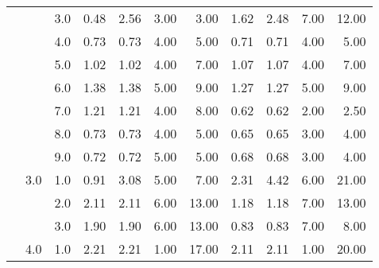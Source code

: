 \begin{tabular}{lllrrrrrrrr}
          &     & 3.0  &       0.48 &      2.56 &  3.00 &   3.00 &       1.62 &      2.48 &  7.00 &  12.00 \\
          &     & 4.0  &       0.73 &      0.73 &  4.00 &   5.00 &       0.71 &      0.71 &  4.00 &   5.00 \\
          &     & 5.0  &       1.02 &      1.02 &  4.00 &   7.00 &       1.07 &      1.07 &  4.00 &   7.00 \\
          &     & 6.0  &       1.38 &      1.38 &  5.00 &   9.00 &       1.27 &      1.27 &  5.00 &   9.00 \\
          &     & 7.0  &       1.21 &      1.21 &  4.00 &   8.00 &       0.62 &      0.62 &  2.00 &   2.50 \\
          &     & 8.0  &       0.73 &      0.73 &  4.00 &   5.00 &       0.65 &      0.65 &  3.00 &   4.00 \\
          &     & 9.0  &       0.72 &      0.72 &  5.00 &   5.00 &       0.68 &      0.68 &  3.00 &   4.00 \\
          & 3.0 & 1.0  &       0.91 &      3.08 &  5.00 &   7.00 &       2.31 &      4.42 &  6.00 &  21.00 \\
          &     & 2.0  &       2.11 &      2.11 &  6.00 &  13.00 &       1.18 &      1.18 &  7.00 &  13.00 \\
          &     & 3.0  &       1.90 &      1.90 &  6.00 &  13.00 &       0.83 &      0.83 &  7.00 &   8.00 \\
          & 4.0 & 1.0  &       2.21 &      2.21 &  1.00 &  17.00 &       2.11 &      2.11 &  1.00 &  20.00 \\
\bottomrule
\end{tabular}

